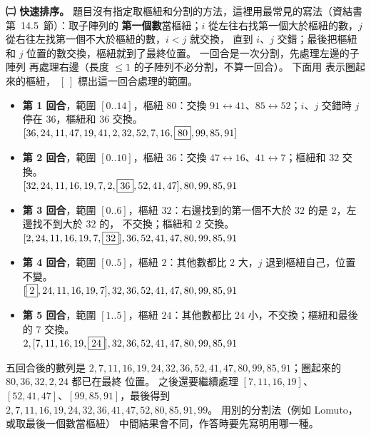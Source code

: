 \begin{pastsoln}
\textbf{㈡ 快速排序。} 題目沒有指定取樞紐和分割的方法，這裡用最常見的寫法（資結書第~14.5~節）：取子陣列的
\textbf{第一個數}當樞紐；$i$ 從左往右找第一個大於樞紐的數，$j$ 從右往左找第一個不大於樞紐的數，$i < j$ 就交換，
直到 $i$、$j$ 交錯；最後把樞紐和 $j$ 位置的數交換，樞紐就到了最終位置。 一回合是一次分割，先處理左邊的子陣列
再處理右邊（長度 $\le 1$ 的子陣列不必分割，不算一回合）。 下面用 \fbox{$\,\cdot\,$} 表示圈起來的樞紐，
$[\ ]$ 標出這一回合處理的範圍。
\begin{itemize}
\item \textbf{第 1 回合}，範圍 $[0..14]$，樞紐 $80$：交換 $91 \leftrightarrow 41$、$85 \leftrightarrow 52$；$i$、$j$ 交錯時
$j$ 停在 $36$，樞紐和 $36$ 交換。\\
$[36, 24, 11, 47, 19, 41, 2, 32, 52, 7, 16, \fbox{80}, 99, 85, 91]$
\item \textbf{第 2 回合}，範圍 $[0..10]$，樞紐 $36$：交換 $47 \leftrightarrow 16$、$41 \leftrightarrow 7$；樞紐和 $32$ 交換。\\
$[32, 24, 11, 16, 19, 7, 2, \fbox{36}, 52, 41, 47], 80, 99, 85, 91$
\item \textbf{第 3 回合}，範圍 $[0..6]$，樞紐 $32$：右邊找到的第一個不大於 $32$ 的是 $2$，左邊找不到大於 $32$ 的，
不交換；樞紐和 $2$ 交換。\\
$[2, 24, 11, 16, 19, 7, \fbox{32}], 36, 52, 41, 47, 80, 99, 85, 91$
\item \textbf{第 4 回合}，範圍 $[0..5]$，樞紐 $2$：其他數都比 $2$ 大，$j$ 退到樞紐自己，位置不變。\\
$[\fbox{2}, 24, 11, 16, 19, 7], 32, 36, 52, 41, 47, 80, 99, 85, 91$
\item \textbf{第 5 回合}，範圍 $[1..5]$，樞紐 $24$：其他數都比 $24$ 小，不交換；樞紐和最後的 $7$ 交換。\\
$2, [7, 11, 16, 19, \fbox{24}], 32, 36, 52, 41, 47, 80, 99, 85, 91$
\end{itemize}
五回合後的數列是 $2, 7, 11, 16, 19, 24, 32, 36, 52, 41, 47, 80, 99, 85, 91$；圈起來的 $80, 36, 32, 2, 24$ 都已在最終
位置。 之後還要繼續處理 $[7, 11, 16, 19]$、$[52, 41, 47]$、$[99, 85, 91]$，最後得到
$2, 7, 11, 16, 19, 24, 32, 36, 41, 47, 52, 80, 85, 91, 99$。 用別的分割法（例如 Lomuto，或取最後一個數當樞紐）
中間結果會不同，作答時要先寫明用哪一種。
\end{pastsoln}
